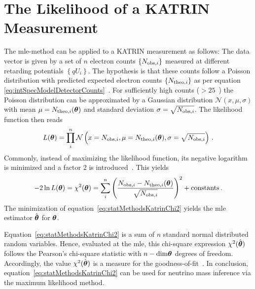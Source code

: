 \section{The Likelihood of a KATRIN Measurement}
\label{sec:statMethodsKATRINLikelihood}
The \gls{mle}-method can be applied to a KATRIN measurement as follows: The data vector is given by a set of $n$ electron counts $\left\{N_{\mathrm{obs,}i}\right\}$ measured at different retarding potentials $\left\{qU_i\right\}$. The hypothesis is that these counts follow a Poisson distribution with predicted expected electron counts $\left\{N_{\mathrm{theo,}i}\right\}$ as per equation \eqref{eq:intSpecModelDetectorCounts}~\cite{Kleesiek2014}. For sufficiently high counts ($>25$~\cite{Kleesiek2019}) the Poisson distribution can be approximated by a Gaussian distribution $\mathcal{N}(x,\mu, \sigma)$ with mean $\mu=N_{\mathrm{theo,}i}(\boldsymbol{\mathbf{\theta}})$ and standard deviation $\sigma=\sqrt{N_{\mathrm{obs,}i}}$. The likelihood function then reads~\cite{Kleesiek2014}
\begin{equation}
	\label{eq:KATRINlikelihood}
	L(\boldsymbol{\mathbf{\theta}}) = \prod_{i}^{n} \mathcal{N}\left(
		x=N_{\mathrm{obs,}i},
		\mu=N_{\mathrm{theo,}i}(\boldsymbol{\mathbf{\theta}}),
		\sigma=\sqrt{N_{\mathrm{obs,}i}}
	\right)
	\text{\,.}
\end{equation}
Commonly, instead of maximizing the likelihood function, its negative logarithm is minimized and a factor 2 is introduced~\cite{ReviewOfParticlePhysics}. This yields
\begin{equation}
	\label{eq:statMethodsKatrinChi2}
	-2\ln L(\boldsymbol{\mathbf{\theta}}) = \chi^2(\boldsymbol{\mathbf{\theta}}) = \sum_i^n
		\left( 
			\frac{N_{\mathrm{obs,}i}-N_{\mathrm{theo,}i}(\boldsymbol{\mathbf{\theta}})}{\sqrt{N_{\mathrm{obs,}i}}}
		\right)^2
		 + \mathrm{constants}
		\text{\,.}
\end{equation}
The minimization of equation~\eqref{eq:statMethodsKatrinChi2} yields the \gls{mle} estimator $\hat{\boldsymbol{\mathbf{\theta}}}$ for $\boldsymbol{\mathbf{\theta}}$.

Equation~\eqref{eq:statMethodsKatrinChi2} is a sum of $n$ standard normal distributed random variables. Hence, evaluated at the \gls{mle}, this chi-square expression $\chi^2(\hat{\boldsymbol{\mathbf{\theta}}})$ follows the Pearson's chi-square statistic with $n-\mathrm{dim}\boldsymbol{\mathbf{\theta}}$ degrees of freedom. Accordingly, the value $\chi^2(\hat{\boldsymbol{\mathbf{\theta}}})$ is a measure for the goodness-of-fit~\cite{ReviewOfParticlePhysics}. In conclusion, equation~\eqref{eq:statMethodsKatrinChi2} can be used for neutrino mass inference via the maximum likelihood method.

